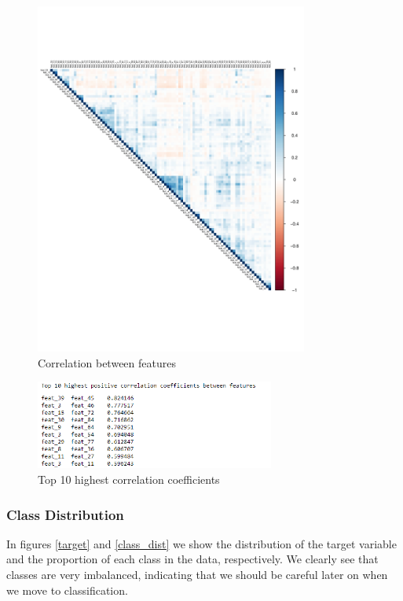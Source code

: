 \documentclass[a4paper,english,12pt]{article}
\begin{document}
\begin{figure}[H]
	\centering
	\includegraphics[width=0.8\textwidth,keepaspectratio]{corr_Otto}
	\caption{Correlation between features}
	\label{correlation}
\end{figure}

\begin{figure}[H]
	\centering
	\includegraphics[width=0.7\textwidth,keepaspectratio]{top10_corr}
	\caption{Top 10 highest correlation coefficients}
	\label{top10}
\end{figure}

\subsubsection{Class Distribution}

In figures \ref{target} and \ref{class_dist} we show the distribution of the target variable and the proportion of each class in the data, respectively.  We clearly see that classes are very imbalanced, indicating that we should be careful later on when we move to classification.
\end{document}
